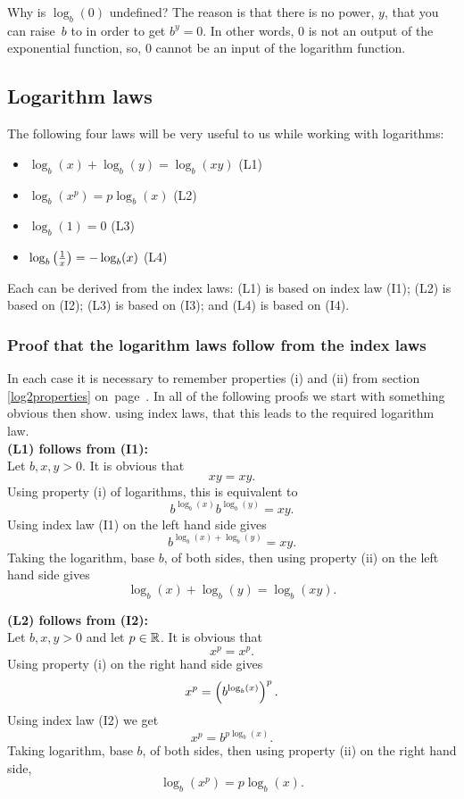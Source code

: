 \noindent Why is $\log_b(0)$ undefined? The reason is that there is no power, $y$, that you can raise~$b$ to in order to get $b^y = 0$. In other words, $0$ is not an output of the exponential function, so, $0$ cannot be an input of the logarithm function.

\subsection{Logarithm laws} \label{log laws}
The following four laws will be very useful to us while working with logarithms:
\begin{itemize}
\item $\log_b(x) + \log_b(y) = \log_b(xy)$ \hfill (L1)
\item $\log_b(x^p) = p\log_b(x)$ \hfill (L2)
\item $\log_b(1) = 0$ \hfill  (L3)
\item $\log_b\left(\frac{1}{x}\right) = -\log_b(x)$ \hfill  (L4)
\end{itemize}
Each can be derived from the index laws: (L1) is based on index law (I1); (L2) is based on (I2); (L3) is based on (I3); and (L4) is based on (I4).

\subsubsection{Proof that the logarithm laws follow from the index laws}
In each case it is necessary to remember properties (i) and (ii) from section \ref{log2properties} on~page~\pageref{log2properties}. In all of the following proofs we start with something obvious then show. using index laws, that this leads to the required logarithm law. \\


\noindent \textbf{(L1) follows from (I1):} \\
Let $b,x,y > 0$. It is obvious that
\[
xy = xy.
\] 
Using property (i) of logarithms, this is equivalent to
\[
b^{\log_b(x)}b^{\log_b(y)} = xy.
\]
Using index law (I1) on the left hand side gives
\[
b^{\log_b(x) + \log_b(y)} = xy.
\]
Taking the logarithm, base $b$, of both sides, then using property (ii) on the left hand side gives
\[
\log_b(x) + \log_b(y) = \log_b(xy).
\]
\bigskip

\noindent \textbf{(L2) follows from (I2):} \\
Let $b,x,y > 0$ and let $p \in \mathbb{R}$. It is obvious that
\[
x^p = x^p.
\]
Using property (i) on the right hand side gives
\[
x^p = \left(b^{\log_b(x)}\right)^p.
\]
Using index law (I2) we get
\[
x^p = b^{p\log_b(x)}.
\]
Taking logarithm, base $b$, of both sides, then using property (ii) on the right hand side,
\[
\log_b(x^p) = p\log_b(x).
\]
\bigskip


